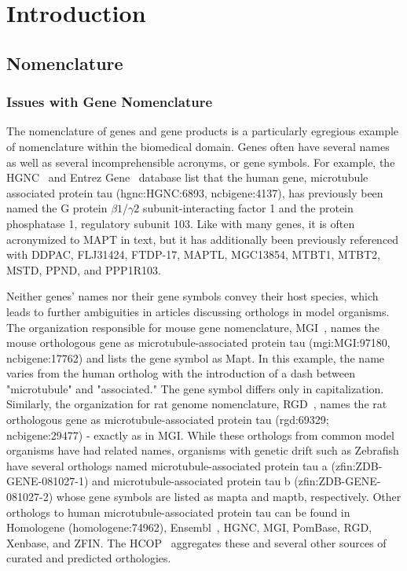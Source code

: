 \chapter{Introduction}

\section{Nomenclature}

\subsection{Issues with Gene Nomenclature}

The nomenclature of genes and gene products is a particularly egregious example of nomenclature within the biomedical domain.
Genes often have several names as well as several incomprehensible acronyms, or gene symbols.
For example, the \ac{HGNC}~\cite{Yates2017} and Entrez Gene~\cite{Maglott2011} database list that the human gene, microtubule associated protein tau (hgnc:HGNC:6893, ncbigene:4137), has previously been named the G protein
$\beta1$/$\gamma2$ subunit-interacting factor 1 and the protein phosphatase 1,
regulatory subunit 103.
Like with many genes, it is often acronymized to MAPT in text, but it has additionally been previously referenced with DDPAC, FLJ31424, FTDP-17, MAPTL, MGC13854, MTBT1, MTBT2, MSTD, PPND, and PPP1R103.

Neither genes' names nor their gene symbols convey their host species, which leads to further ambiguities in articles discussing orthologs in model organisms.
The organization responsible for mouse gene nomenclature, \ac{MGI}~\cite{Blake2017}, names the mouse orthologous gene as microtubule-associated protein tau (mgi:MGI:97180, ncbigene:17762) and lists the gene symbol as Mapt.
In this example, the name varies from the human ortholog with the introduction of a dash between "microtubule" and "associated."
The gene symbol differs only in capitalization.
Similarly, the organization for rat genome nomenclature, \ac{RGD}~\cite{Shimoyama2015}, names the rat orthologous gene as microtubule-associated protein tau (rgd:69329; ncbigene:29477) - exactly as in \ac{MGI}.
While these orthologs from common model organisms have had related names, organisms with genetic drift such as Zebrafish have several orthologs named microtubule-associated protein tau a (zfin:ZDB-GENE-081027-1) and microtubule-associated protein tau b (zfin:ZDB-GENE-081027-2) whose gene symbols are listed as mapta and maptb, respectively.
Other orthologs to human microtubule-associated protein tau can be found in Homologene (homologene:74962), Ensembl~\cite{Zerbino2018}, \ac{HGNC}, \ac{MGI}, PomBase, \ac{RGD}, Xenbase, and \ac{ZFIN}.
The \ac{HCOP}~\cite{Wright2005} aggregates these and several other sources of curated and predicted orthologies.

